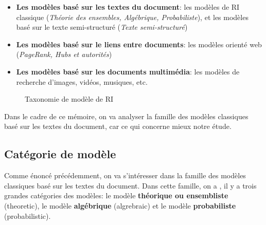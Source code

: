 \begin{itemize}
    \item \textbf{Les modèles basé sur les textes du document}: les modèles de RI classique (\textit{Théorie des ensembles, Algébrique, Probabiliste}), et les modèles basé sur le texte semi-structuré (\textit{Texte semi-structuré})
    \item \textbf{Les modèles basé sur le liens entre documents}: les modèles orienté web (\textit{PageRank, Hubs et autorités})
    \item \textbf{Les modèles basé sur les documents multimédia}: les modèles de recherche d'images, vidéos, musiques, etc.
\end{itemize}

\begin{figure}[htbp]
    \begin{center}
    \end{center}
    \caption{Taxonomie de modèle de RI \citep{soulier2014:def-evaluation-modele}}
    \label{fig:modele-ri}
\end{figure}

Dans le cadre de ce mémoire, on va analyser la famille des modèles classiques basé sur les textes du document, car ce qui concerne mieux notre étude.

\subsection{Catégorie de modèle}
Comme énoncé précédemment, on va s’intéresser dans la famille des modèles classiques basé sur les textes du document. Dans cette famille, on a \citep*{modern-ir, approche-semantique,soulier2014:def-evaluation-modele}, il y a trois grandes catégories des modèles: le modèle \textbf{théorique ou ensembliste} (theoretic), le modèle \textbf{algébrique} (algrebraic) et le modèle \textbf{probabiliste} (probabilistic).

